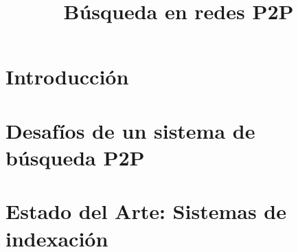 \documentclass[conference]{IEEEtran}
\title{Búsqueda en  redes P2P}
\author{
\IEEEauthorblockN{
Rodrigo G. Fernández\IEEEauthorrefmark{1}
}
\IEEEauthorblockA{
\IEEEauthorrefmark{1}Computer Systems Research Group~\cite{CSRG}, Universidad Técnica Federico Santa María, Av. ~España~1680, Valparaíso, Chile
}
}
\begin{document}


\pagestyle{empty}
\maketitle\thispagestyle{empty}



%
%
%
%
%



\section{Introducción}
\label{sec:intro}


\section{Desafíos de un sistema de búsqueda P2P}
\label{sec:challenges}


\section{Estado del Arte: Sistemas de indexación}
\label{sec:soa_indexing}


%
\end{document}

